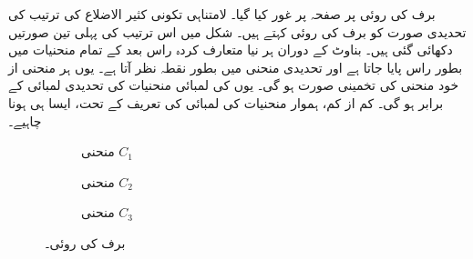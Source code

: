 برف کی روئی پر صفحہ  پر غور کیا گیا۔ لامتناہی تکونی کثیر الاضلاع کی ترتیب  کی تحدیدی صورت کو برف کی روئی  کہتے ہیں۔  شکل  میں اس ترتیب کی پہلی تین صورتیں دکھائی گئی ہیں۔ بناوٹ کے دوران ہر نیا متعارف کردہ راس بعد کے تمام منحنیات میں بطور راس پایا جاتا ہے اور تحدیدی منحنی  میں بطور نقطہ نظر آتا ہے۔ یوں ہر منحنی   از خود منحنی  کی تخمینی صورت ہو گی۔ یوں  کی لمبائی منحنیات  کی تحدیدی لمبائی کے برابر ہو گی۔ کم از کم،  ہموار منحنیات کی لمبائی کی تعریف کے تحت،  ایسا ہی ہونا چاہیے۔ 
\begin{figure}
\centering
\begin{subfigure}{0.22\textwidth}
\centering
{}
\caption{منحنی $C_1$}
\end{subfigure}\hfill
\begin{subfigure}{0.22\textwidth}
\centering
{}
\caption{منحنی $C_2$}
\end{subfigure}\hfill
\begin{subfigure}{0.22\textwidth}
\centering
{}
\caption{منحنی $C_3$}
\end{subfigure}
\caption{برف کی روئی۔}
\label{شکل_تکمل_استعمال_روئی_برف}
\end{figure}

